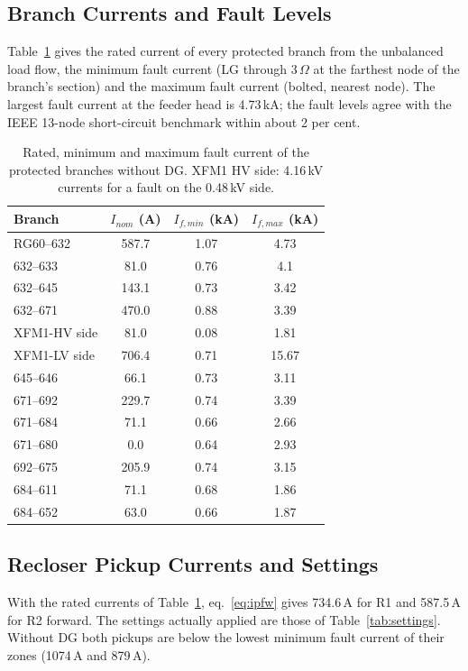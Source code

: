 \documentclass[12pt,a4paper]{article}
\newcommand{\ohm}{\,\ensuremath{\Omega}}
\begin{document}
\subsection{Branch Currents and Fault Levels}
Table~\ref{tab:t2} gives the rated current of every protected branch from the unbalanced load flow, the
minimum fault current (LG through 3\ohm{} at the farthest node of the branch's section) and the maximum
fault current (bolted, nearest node). The largest fault current at the feeder head is 4.73\,kA; the fault
levels agree with the IEEE 13-node short-circuit benchmark within about 2 per cent.

\begin{table}[H]
\centering\footnotesize
\begin{tabular}{|l|c|c|c|}
\hline
\textbf{Branch} & \textbf{$I_{nom}$ (A)} & \textbf{$I_{f,min}$ (kA)} & \textbf{$I_{f,max}$ (kA)} \\ \hline
RG60--632 & 587.7 & 1.07 & 4.73 \\ \hline
632--633 & 81.0 & 0.76 & 4.1 \\ \hline
632--645 & 143.1 & 0.73 & 3.42 \\ \hline
632--671 & 470.0 & 0.88 & 3.39 \\ \hline
XFM1-HV side & 81.0 & 0.08 & 1.81 \\ \hline
XFM1-LV side & 706.4 & 0.71 & 15.67 \\ \hline
645--646 & 66.1 & 0.73 & 3.11 \\ \hline
671--692 & 229.7 & 0.74 & 3.39 \\ \hline
671--684 & 71.1 & 0.66 & 2.66 \\ \hline
671--680 & 0.0 & 0.64 & 2.93 \\ \hline
692--675 & 205.9 & 0.74 & 3.15 \\ \hline
684--611 & 71.1 & 0.68 & 1.86 \\ \hline
684--652 & 63.0 & 0.66 & 1.87 \\ \hline
\end{tabular}
\caption{Rated, minimum and maximum fault current of the protected branches without DG. XFM1 HV side: 4.16\,kV
currents for a fault on the 0.48\,kV side.}
\label{tab:t2}
\end{table}

\subsection{Recloser Pickup Currents and Settings}
With the rated currents of Table~\ref{tab:t2}, eq.~\eqref{eq:ipfw} gives 734.6\,A for R1 and 587.5\,A for R2
forward. The settings actually applied are those of Table~\ref{tab:settings}. Without DG both pickups are
below the lowest minimum fault current of their zones (1074\,A and 879\,A).
\end{document}
